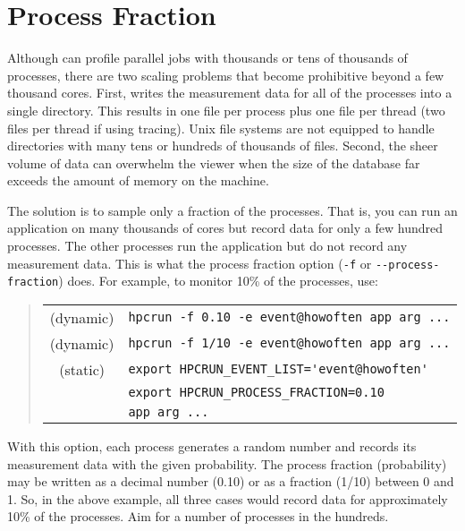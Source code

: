 
\section{Process Fraction}

Although \hpcrun{} can profile parallel jobs with thousands or tens of
thousands of processes, there are two scaling problems that become
prohibitive beyond a few thousand cores.  First, \hpcrun{} writes the
measurement data for all of the processes into a single directory.
This results in one file per process plus one file per thread (two
files per thread if using tracing).  Unix file systems are not
equipped to handle directories with many tens or hundreds of thousands
of files.  Second, the sheer volume of data can overwhelm the viewer
when the size of the database far exceeds the amount of memory on the
machine.

The solution is to sample only a fraction of the processes.  That is,
you can run an application on many thousands of cores but record data
for only a few hundred processes.  The other processes run the
application but do not record any measurement data.  This is what the
process fraction option (\verb|-f| or \verb|--process-fraction|) does.
For example, to monitor 10\% of the processes, use:

\begin{quote}
\begin{tabular}{@{}cl}
(dynamic) & \verb|hpcrun -f 0.10 -e event@howoften app arg ...| \\
(dynamic) & \verb|hpcrun -f 1/10 -e event@howoften app arg ...| \\
(static)  & \verb|export HPCRUN_EVENT_LIST='event@howoften'| \\
& \verb|export HPCRUN_PROCESS_FRACTION=0.10| \\
& \verb|app arg ...|
\end{tabular}
\end{quote}

With this option, each process generates a random number and records
its measurement data with the given probability.  The process fraction
(probability) may be written as a decimal number (0.10) or as a
fraction (1/10) between 0 and 1.  So, in the above example, all three
cases would record data for approximately 10\% of the processes.  Aim
for a number of processes in the hundreds.



